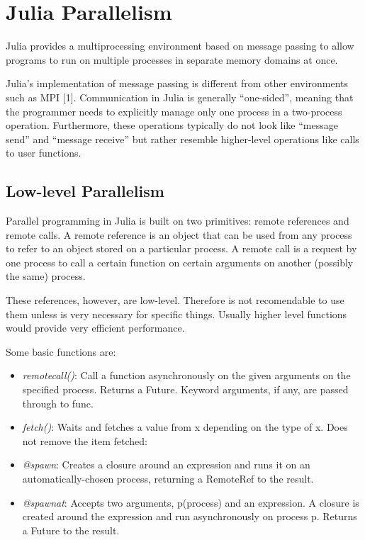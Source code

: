 \documentclass[letterpaper,10pt,english]{sphinxmanual}
\begin{document}
\chapter{Julia Parallelism}
\label{JuliaPar:juliapar}\label{JuliaPar:julia-parallelism}\label{JuliaPar::doc}
Julia provides a multiprocessing environment based on message passing to allow programs to run on multiple processes in separate memory domains at once.

Julia’s implementation of message passing is different from other environments such as MPI {[}1{]}. Communication in Julia is generally “one-sided”, meaning that the programmer needs to explicitly manage only one process in a two-process operation. Furthermore, these operations typically do not look like “message send” and “message receive” but rather resemble higher-level operations like calls to user functions.


\section{Low-level Parallelism}
\label{JuliaPar:low-level-parallelism}
Parallel programming in Julia is built on two primitives: remote references and remote calls. A remote reference is an object that can be used from any process to refer to an object stored on a particular process. A remote call is a request by one process to call a certain function on certain arguments on another (possibly the same) process.

These references, however,  are low-level. Therefore is not recomendable to use them unless is very necessary for specific things. Usually higher level functions would provide very efficient performance.

Some basic functions are:
\begin{itemize}
\item {} 
\emph{remotecall()}: Call a function asynchronously on the given arguments on the specified process. Returns a Future. Keyword arguments, if any, are passed through to func.

\item {} 
\emph{fetch()}: Waits and fetches a value from x depending on the type of x. Does not remove the item fetched:

\item {} 
\emph{@spawn}: Creates a closure around an expression and runs it on an automatically-chosen process, returning a RemoteRef to the result.

\item {} 
\emph{@spawnat}: Accepts two arguments, p(process) and an expression. A closure is created around the expression and run asynchronously on process p. Returns a Future to the result.

\end{itemize}
\end{document}
